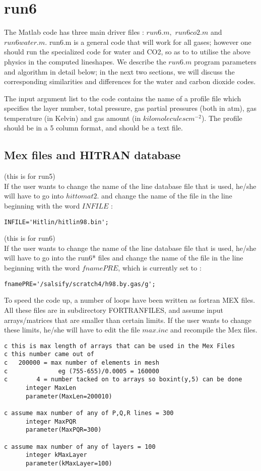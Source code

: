 \documentclass[11pt]{article}
\begin{document}
\section{run6}

The Matlab code has three main driver files : $run6.m,$ $run6co2.m$ and 
$run6water.m.$ run6.m is a general code that will work for all gases; 
however 
one should run the specialized code for water and CO2, so as to to utilise 
the above physics in the computed lineshapes. We describe the $run6.m$ 
program parameters and algorithm in detail below; in the next two sections, 
we will discuss the corresponding similarities and differences for the 
water and carbon dioxide codes.

The input argument list to the code contains the name of a profile file 
which specifies the layer number, total pressure, gas partial 
pressures (both in atm), gas temperature (in Kelvin) and gas amount 
(in $kilomolecules cm^{-2}$). The profile should be in a 5 column format, 
and should be a text file.

\subsection{Mex files and HITRAN database}
(this is for run5) \\
If the user wants to change the name of the line database file that is used,
he/she will have to go into $hittomat2.$ and change the name of the file in
the line beginning with the word $INFILE$ :
\begin{verbatim}
INFILE='Hitlin/hitlin98.bin';
\end{verbatim}

(this is for run6) \\
If the user wants to change the name of the line database file that is used,
he/she will have to go into the run6* files and change the name of the 
file in the line beginning with the word $fnamePRE$, which is currently 
set to :
\begin{verbatim}
fnamePRE='/salsify/scratch4/h98.by.gas/g';
\end{verbatim}

To speed the code up, a number of loops have been written as fortran MEX 
files.
All these files are in subdirectory FORTRANFILES, and assume input 
arrays/matrices that are smaller than certain limits. If the user wants to 
change these limits, he/she will have to edit the file $max.inc$ and 
recompile the Mex files.

\begin{verbatim}
c this is max length of arrays that can be used in the Mex Files  
c this number came out of 
c   200000 = max number of elements in mesh 
c              eg (755-655)/0.0005 = 160000
c        4 = number tacked on to arrays so boxint(y,5) can be done  
      integer MaxLen
      parameter(MaxLen=200010)

c assume max number of any of P,Q,R lines = 300
      integer MaxPQR
      parameter(MaxPQR=300)

c assume max number of any of layers = 100
      integer kMaxLayer
      parameter(kMaxLayer=100)
\end{verbatim}
\end{document}
